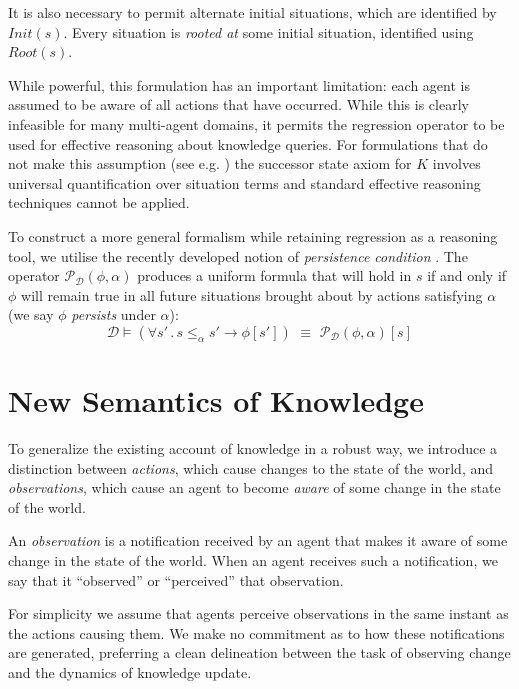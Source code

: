 \documentclass{ifaamas-submission}
\begin{document}
It is also necessary to permit alternate initial situations, which are
identified by $Init(s)$. Every situation is \emph{rooted at}
some initial situation, identified using $Root(s)$.

While powerful, this formulation has an important limitation: each
agent is assumed to be aware of all actions that have occurred.
While this is clearly infeasible for many multi-agent domains, it permits
the regression operator \cite{pirri99contributions_sitcalc} to be used
for effective reasoning about knowledge queries.
For formulations that do not make this assumption (see e.g. 
 \cite{Lesperance99sitcalc_approach}) the successor state axiom for $K$
involves universal quantification over situation terms and standard
effective reasoning techniques cannot be applied.

To construct a more general formalism while retaining regression as
a reasoning tool, we utilise the recently developed notion of 
\emph{persistence condition} \cite{kelly07sc_persistence}. The operator
$\mathcal{P}_{\mathcal{D}}(\phi,\alpha)$ produces a uniform formula
that will hold in $s$ if and only if $\phi$ will remain true in all future 
situations brought about by actions 
satisfying $\alpha$ (we say $\phi$ \emph{persists} under $\alpha$):
\begin{equation*}
\mathcal{D} \models \left(\forall s'\,.\,s \leq_{\alpha} s' \rightarrow \phi[s']\right)\,\,\equiv\,\, \mathcal{P}_{\mathcal{D}}(\phi,\alpha)[s]
\end{equation*}

\section{New Semantics of Knowledge}

\label{sec:New-Semantics}

To generalize the existing account of knowledge in a robust way, we introduce 
a distinction between \emph{actions}, which cause changes to the state
of the world, and \emph{observations}, which cause an agent to become
\emph{aware} of some change in the state of the world.
\begin{definition}
An \emph{observation} is a notification received by an agent that
makes it aware of some change in the state of the world. When an agent
receives such a notification, we say that it {}``observed'' or {}``perceived''
that observation.
\end{definition}
For simplicity we assume that agents perceive observations 
in the same instant as the actions causing them. We make
no commitment as to how these notifications are generated, preferring
a clean delineation between the task of observing change and the dynamics
of knowledge update.
\end{document}
